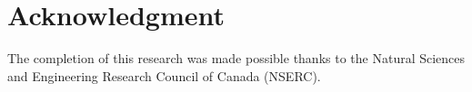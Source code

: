\documentclass[conference]{IEEEtran}
\begin{document}


\section*{Acknowledgment}

The completion of this research was made possible thanks to the Natural Sciences and Engineering Research Council of Canada (NSERC). 

\end{document}
